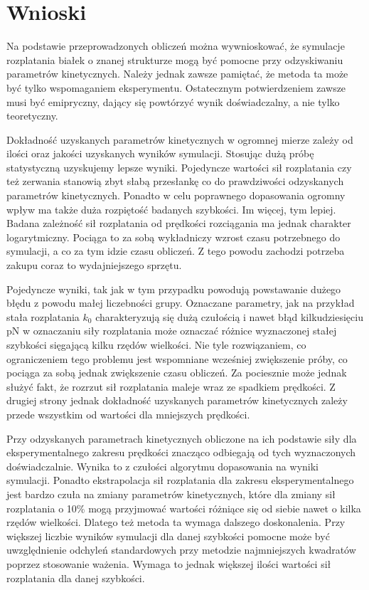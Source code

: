 \chapter{Wnioski}

Na podstawie przeprowadzonych obliczeń można wywnioskować, że symulacje rozplatania białek o znanej strukturze mogą być pomocne przy odzyskiwaniu parametrów kinetycznych. Należy jednak zawsze pamiętać, że metoda ta może być tylko wspomaganiem eksperymentu. Ostatecznym potwierdzeniem zawsze musi być emipryczny, dający się powtórzyć wynik doświadczalny, a nie tylko teoretyczny. 

Dokładność uzyskanych parametrów kinetycznych w ogromnej mierze zależy od ilości oraz jakości uzyskanych wyników symulacji. Stosując dużą próbę statystyczną uzyskujemy lepsze wyniki. Pojedyncze wartości sił rozplatania czy też zerwania stanowią zbyt słabą przesłankę co do prawdziwości odzyskanych parametrów kinetycznych. Ponadto w celu poprawnego dopasowania ogromny wpływ ma także duża rozpiętość badanych szybkości. Im więcej, tym lepiej. Badana zależność sił rozplatania od prędkości rozciągania ma jednak charakter logarytmiczny. Pociąga to za sobą wykładniczy wzrost czasu potrzebnego do symulacji, a co za tym idzie czasu obliczeń. Z tego powodu zachodzi potrzeba zakupu coraz to wydajniejszego sprzętu. 

Pojedyncze wyniki, tak jak w tym przypadku powodują powstawanie dużego błędu z powodu małej liczebności grupy. Oznaczane parametry, jak na przykład stała rozplatania $k_{0}$ charakteryzują się dużą czułością i nawet błąd kilkudziesięciu pN w oznaczaniu siły rozplatania może oznaczać różnice wyznaczonej stałej szybkości sięgającą kilku rzędów wielkości. Nie tyle rozwiązaniem, co ograniczeniem tego problemu jest wspomniane wcześniej zwiększenie próby, co pociąga za sobą jednak zwiększenie czasu obliczeń. Za pociesznie może jednak służyć fakt, że rozrzut sił rozplatania maleje wraz ze spadkiem prędkości. Z drugiej strony jednak dokładność uzyskanych parametrów kinetycznych zależy przede wszystkim od wartości dla mniejszych prędkości.

Przy odzyskanych parametrach kinetycznych obliczone na ich podstawie siły dla eksperymentalnego zakresu prędkości znacząco odbiegają od tych wyznaczonych doświadczalnie. Wynika to z czułości algorytmu dopasowania na wyniki symulacji. Ponadto ekstrapolacja sił rozplatania dla zakresu eksperymentalnego jest bardzo czuła na zmiany parametrów kinetycznych, które dla zmiany sił rozplatania o 10\% mogą przyjmować wartości różniące się od siebie nawet o kilka rzędów wielkości. Dlatego też metoda ta wymaga dalszego doskonalenia. Przy większej liczbie wyników symulacji dla danej szybkości pomocne może być uwzględnienie odchyleń standardowych przy metodzie najmniejszych kwadratów poprzez stosowanie ważenia. Wymaga to jednak większej ilości wartości sił rozplatania dla danej szybkości.

